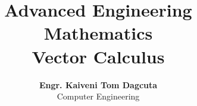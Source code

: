 \documentclass[12pt]{article}
\title{Advanced Engineering Mathematics \\ \large Vector Calculus}
\author{\textbf{Engr. Kaiveni Tom Dagcuta} \\ Computer Engineering}
\date{}
\begin{document}











\bigskip







\bigskip






\bigskip





\bigskip





\bigskip






\bigskip



\bigskip


\end{document}
